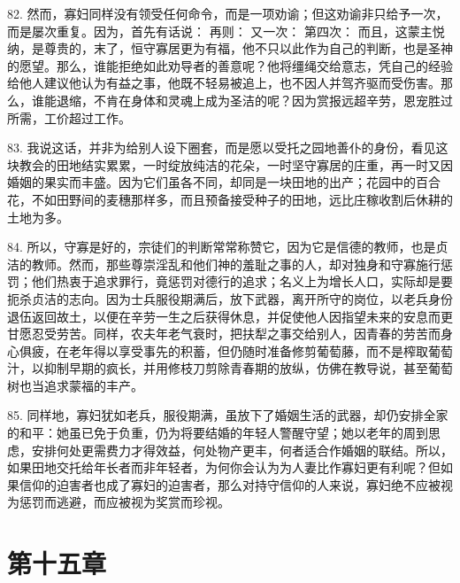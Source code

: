 82. 然而，寡妇同样没有领受任何命令，而是一项劝谕；但这劝谕非只给予一次，而是屡次重复。因为，首先有话说：  再则：  又一次：  第四次：  而且，这蒙主悦纳，是尊贵的，末了，恒守寡居更为有福，他不只以此作为自己的判断，也是圣神的愿望。那么，谁能拒绝如此劝导者的善意呢？他将缰绳交给意志，凭自己的经验给他人建议他认为有益之事，他既不轻易被追上，也不因人并驾齐驱而受伤害。那么，谁能退缩，不肯在身体和灵魂上成为圣洁的呢？因为赏报远超辛劳，恩宠胜过所需，工价超过工作。\par

83. 我说这话，并非为给别人设下圈套，而是愿以受托之园地善仆的身份，看见这块教会的田地结实累累，一时绽放纯洁的花朵，一时坚守寡居的庄重，再一时又因婚姻的果实而丰盛。因为它们虽各不同，却同是一块田地的出产；花园中的百合花，不如田野间的麦穗那样多，而且预备接受种子的田地，远比庄稼收割后休耕的土地为多。\par

84. 所以，守寡是好的，宗徒们的判断常常称赞它，因为它是信德的教师，也是贞洁的教师。然而，那些尊崇淫乱和他们神的羞耻之事的人，却对独身和守寡施行惩罚；他们热衷于追求罪行，竟惩罚对德行的追求；名义上为增长人口，实际却是要扼杀贞洁的志向。因为士兵服役期满后，放下武器，离开所守的岗位，以老兵身份退伍返回故土，以便在辛劳一生之后获得休息，并促使他人因指望未来的安息而更甘愿忍受劳苦。同样，农夫年老气衰时，把扶犁之事交给别人，因青春的劳苦而身心俱疲，在老年得以享受事先的积蓄，但仍随时准备修剪葡萄藤，而不是榨取葡萄汁，以抑制早期的疯长，并用修枝刀剪除青春期的放纵，仿佛在教导说，甚至葡萄树也当追求蒙福的丰产。\par

85. 同样地，寡妇犹如老兵，服役期满，虽放下了婚姻生活的武器，却仍安排全家的和平：她虽已免于负重，仍为将要结婚的年轻人警醒守望；她以老年的周到思虑，安排何处更需费力才得效益，何处物产更丰，何者适合作婚姻的联结。所以，如果田地交托给年长者而非年轻者，为何你会认为为人妻比作寡妇更有利呢？但如果信仰的迫害者也成了寡妇的迫害者，那么对持守信仰的人来说，寡妇绝不应被视为惩罚而逃避，而应被视为奖赏而珍视。\par


\section{第十五章}

